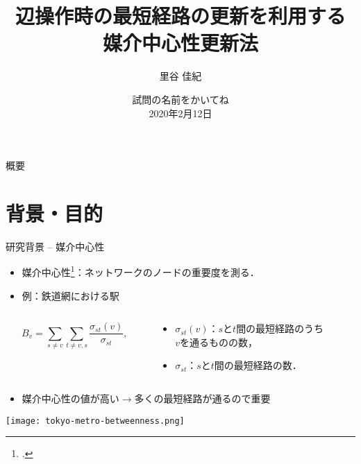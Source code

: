 \documentclass[dvipdfmx,fleqn]{beamer}
\title[媒介中心性更新法]{辺操作時の最短経路の更新を利用する \\ 媒介中心性更新法}
\author[里谷]{里谷 佳紀}
\institute[情数工研]{情報数理工学研究室}
\date[試問]{\alert{試問の名前をかいてね} \\ 2020年2月12日}
\begin{document}
\makeIMELABtitle

\begin{frame}{概要}
  \tableofcontents
\end{frame}

\section{背景・目的}
\begin{frame}[t]{研究背景 -- 媒介中心性}
  \begin{itemize}
  \item \alert{媒介中心性}\footcite{05Freeman1977}：ネットワークのノードの重要度を測る．
  \item[] 例：鉄道網における駅
  \end{itemize}
  \begin{columns}
    \begin{column}{.4\textwidth}
      \begin{equation*}
        B_v=\sum_{s\neq v}\sum_{t\neq v,s}\frac{\sigma_{st}(v)}{\sigma_{st}},
      \end{equation*}
    \end{column}
    \begin{column}{.6\textwidth}
      \begin{itemize}
      \item $\sigma_{st}(v)$：$s$と$t$間の最短経路のうち\\$v$を通るものの数，
      \item $\sigma_{st}$：$s$と$t$間の最短経路の数．
      \end{itemize}
    \end{column}
  \end{columns}
  \medskip
  \begin{itemize}
  \item 媒介中心性の値が高い$\rightarrow$\alert{多くの最短経路が通る}ので重要
  \end{itemize}
  \vspace{-.5em}
  \begin{center}
    \texttt{[image: tokyo-metro-betweenness.png]}
  \end{center}
\end{frame}
\end{document}
